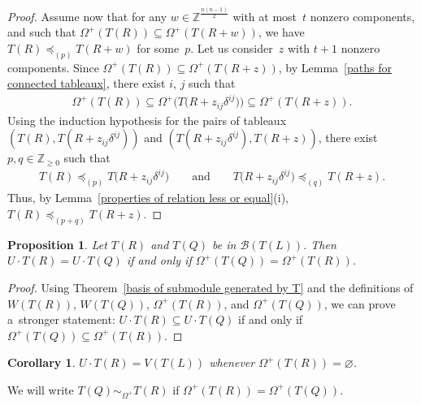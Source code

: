 \documentclass[pdftex]{sigma}
\numberwithin{equation}{section}
\newtheorem{Corollary}[Theorem]{Corollary}
\newtheorem{Proposition}[Theorem]{Proposition}
{ \theoremstyle{definition}
\newtheorem{Definition}[Theorem]{Definition}
\newtheorem{Note}[Theorem]{Note}
\newtheorem{Example}[Theorem]{Example}
\newtheorem{Notation}[Theorem]{Notation}
\newtheorem{Remark}[Theorem]{Remark} }
\begin{document}
\begin{proof}
Assume now that for any $w\in\mathbb{Z}^{\frac{n(n-1)}{2}}$ with at most~$t$ nonzero components, and such that
$\Omega^{+}(T(R))\subseteq\Omega^{+}(T(R+w))$, we have $T(R)\preceq_{(p)} T(R+w)$ for some~$p$.
Let us consider~$z$ with $t+1$ nonzero components.
Since $\Omega^{+}(T(R))\subseteq \Omega^{+}(T(R+z))$, by Lemma~\ref{paths for connected tableaux}, there exist $i$, $j$
such that
\begin{gather*}
\Omega^{+}(T(R))\subseteq\Omega^{+}\big(T\big(R+z_{ij}\delta^{ij}\big)\big)\subseteq \Omega^{+}(T(R+z)).
\end{gather*}
Using the induction hypothesis for the pairs of tableaux $(T(R), T(R+z_{ij}\delta^{ij}))$ and
$(T(R+z_{ij}\delta^{ij}),T(R+z))$, there exist $p,q\in\mathbb{Z}_{\geq 0}$ such that
\begin{gather*}
T(R)\preceq_{(p)} T\big(R+z_{ij}\delta^{ij}\big)\qquad \text{and} \qquad T\big(R+z_{ij}\delta^{ij}\big)\preceq_{(q)} T(R+z).
\end{gather*}
Thus, by Lemma~\ref{properties of relation less or equal}(i), $T(R)\preceq_{(p+q)}T(R+z)$.
\end{proof}

\begin{Proposition}
\label{when two tableaux generate the same submodule}
Let $T(R)$ and $T(Q)$ be in $\mathcal{B}(T(L))$.
Then $U\cdot T(R)= U\cdot T(Q)$ if and only if $\Omega^{+}(T(Q))=\Omega^{+}(T(R))$.
\end{Proposition}
\begin{proof}\sloppy
Using Theorem~\ref{basis of submodule generated by T} and the def\/initions of $ W(T(R))$, $W(T(Q))$, $\Omega^{+}(T(R))$,
and $\Omega^{+}(T(Q))$, we can prove a~stronger statement: $U\cdot T(R) \subseteq U\cdot T(Q)$ if and only if
$\Omega^{+}(T(Q))\subseteq\Omega^{+}(T(R))$.
\end{proof}

\begin{Corollary}
$U \cdot T(R)=V(T(L))$ whenever $\Omega^{+}(T(R))=\varnothing$.
\end{Corollary}

\begin{Definition}
We will write $T(Q)\sim_{\Omega^+}T(R)$ if $\Omega^{+}(T(R)) = \Omega^{+}(T(Q))$.
\end{Definition}
\end{document}
